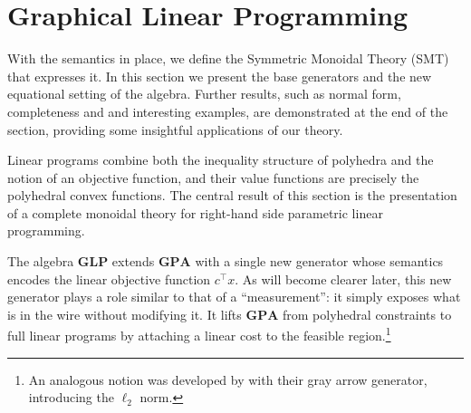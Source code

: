 
\section{Graphical Linear Programming}\label{sec:glp}

With the semantics in place, we define the Symmetric Monoidal Theory (SMT)
that expresses it. In this section we present the base generators and
the new equational setting of the algebra. Further results, such as normal form,
completeness and and interesting examples, are demonstrated
at the end of the section, providing some insightful applications of our theory.

Linear programs combine both the inequality structure
of polyhedra and the notion of an objective function,
and their value functions are precisely the polyhedral convex functions.
The central result of this section is the presentation of a
complete monoidal theory for right-hand side parametric linear programming.

The algebra $\mathbf{GLP}$ extends
$\mathbf{GPA}$ with a single new generator whose semantics encodes the
linear objective function $c^\top x$. As will become clearer later, this
new generator plays a role similar to that of a ``measurement'': it simply exposes
what is in the wire without modifying it.
It lifts $\mathbf{GPA}$ from polyhedral constraints
to full linear programs by attaching a
linear cost to the feasible region.\footnote{An analogous notion was developed by
\cite{stein2024gqa} with their gray arrow generator, introducing the $\ell_2$ norm.}

